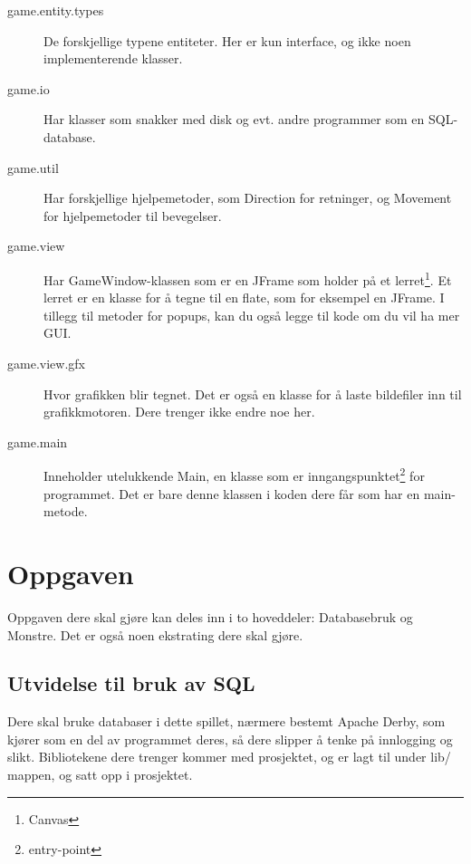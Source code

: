 \documentclass[norsk]{article}
\begin{document}
\begin{description}
\begin{figure}[h!]
  \end{figure}
\item [game.entity.types] De forskjellige typene entiteter. Her er kun interface, og ikke noen implementerende klasser.
\item [game.io] Har klasser som snakker med disk og evt. andre programmer som en SQL-database.
\item [game.util] Har forskjellige hjelpemetoder, som Direction for retninger, og Movement for hjelpemetoder til bevegelser.
\item [game.view] Har GameWindow-klassen som er en JFrame som holder på et lerret\footnote{Canvas}. Et lerret er en klasse for å tegne til en flate, som for eksempel en JFrame.
  I tillegg til metoder for popups, kan du også legge til kode om du vil ha mer GUI.
\item [game.view.gfx] Hvor grafikken blir tegnet. Det er også en klasse for å laste bildefiler inn til grafikkmotoren. Dere trenger ikke endre noe her. %
\item [game.main] Inneholder utelukkende Main, en klasse som er inngangspunktet\footnote{entry-point} for programmet. Det er bare denne klassen i koden dere får som har en main-metode.
\end{description}

\section{Oppgaven}
Oppgaven dere skal gjøre kan deles inn i to hoveddeler: Databasebruk og Monstre. Det er også noen ekstrating dere skal gjøre.

\subsection{Utvidelse til bruk av SQL}
\label{subsec:sqloppgave}
Dere skal bruke databaser i dette spillet, nærmere bestemt Apache Derby, som kjører som en del av programmet deres, så dere slipper å tenke på innlogging og slikt. %
Bibliotekene dere trenger kommer med prosjektet, og er lagt til under lib/ mappen, og satt opp i prosjektet.
\end{document}
